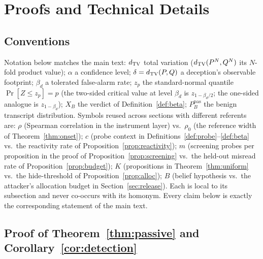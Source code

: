 \section{Proofs and Technical Details}\label{app:proofs}

\subsection{Conventions}\label{app:notation}

Notation below matches the main text: $d_{\mathrm{TV}}$ total variation
($d_{\mathrm{TV}}(P^{N},Q^{N})$ its $N$-fold product value); $\alpha$ a confidence
level; $\delta=d_{\mathrm{TV}}(P,Q)$ a deception's observable footprint; $\beta_d$ a
tolerated false-alarm rate; $z_p$ the standard-normal quantile
$\Pr[Z\le z_p]=p$ (the two-sided critical value at level $\beta_d$ is
$z_{1-\beta_d/2}$; the one-sided analogue is $z_{1-\beta_d}$);
$X_B$ the verdict of
Definition~\ref{def:beta}; $P^{\mathrm{pas}}_B$ the benign transcript
distribution. Symbols reused across sections with different referents are:
$\rho$ (Spearman correlation in the instrument layer) vs.\ $\rho_0$ (the
reference width of Theorem~\ref{thm:onset}); $c$ (probe context in
Definitions~\ref{def:probe}--\ref{def:beta} vs.\ the reactivity rate of
Proposition~\ref{prop:reactivity}); $m$ (screening probes per proposition
in the proof of Proposition~\ref{prop:screening} vs.\ the held-out misread
rate of Proposition~\ref{prop:budget}); $K$ (propositions in
Theorem~\ref{thm:uniform} vs.\ the hide-threshold of
Proposition~\ref{prop:alloc}); $B$ (belief hypothesis vs.\ the attacker's
allocation budget in Section~\ref{sec:release}). Each is local to its
subsection and never co-occurs with its homonym. Every claim below is
exactly the corresponding statement of the main text.

\subsection{Proof of Theorem~\ref{thm:passive} and
Corollary~\ref{cor:detection}}\label{app:t1}

